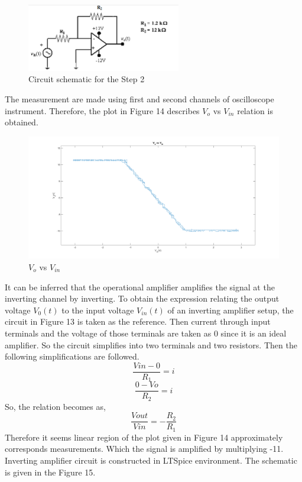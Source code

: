 \documentclass[letterpaper,12pt]{article}
\begin{document}
\begin{figure}[H]
	\centering
   \includegraphics[width=0.6\textwidth]{circuit3.png}
   \caption{Circuit schematic for the Step 2}
\end{figure} 
The measurement are made using first and second channels of oscilloscope instrument. Therefore, the plot in Figure 14 describes \(V_{o} \) vs \( V_{in}\) relation is obtained.
\begin{figure}[H]
	\centering
   \includegraphics[width=1\textwidth]{e_2.png}
   \caption{\(V_{o} \) vs \( V_{in}\)}
\end{figure} 
It can be inferred that the operational amplifier amplifies the signal at the inverting channel by inverting. To obtain the expression relating the output voltage \(V_0 (t)\) to the input voltage \(V_{in} (t)\) of an inverting amplifier setup, the circuit in Figure 13 is taken as the reference. Then current through input terminals and the voltage of those terminals are taken as 0 since it is an ideal amplifier. So the circuit simplifies into two terminals and two resistors. Then the following simplifications are followed.
\[\frac{V{in} - 0 }{R_1} = i\]
\[\frac{0 - V{o} }{R_2} = i\]
So, the relation becomes as,
\[\frac{V{out}}{V{in}} = -\frac{R_2}{R_1}\]
Therefore it seems linear region of the plot given in Figure 14 approximately corresponds measurements. Which the signal is amplified by multiplying -11.
Inverting amplifier circuit is constructed in LTSpice environment. The schematic is given in the Figure 15.
\end{document}
